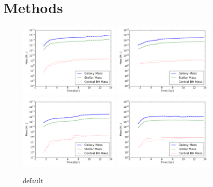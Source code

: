 \documentclass[english, apj]{emulateapj}
\begin{document}
\section{Methods}\label{sec:methods}
\begin{figure}[htbp]
\begin{center}
\includegraphics[width=0.45\textwidth]{plots/Masses_plot_galaxy_1.png}
\includegraphics[width=0.45\textwidth]{plots/Masses_plot_galaxy_65.png}\\
\includegraphics[width=0.45\textwidth]{plots/Masses_plot_galaxy_187.png}
\includegraphics[width=0.45\textwidth]{plots/Masses_plot_galaxy_217.png}\\
\caption{default}
\label{default}
\end{center}
\end{figure}
\end{document}
